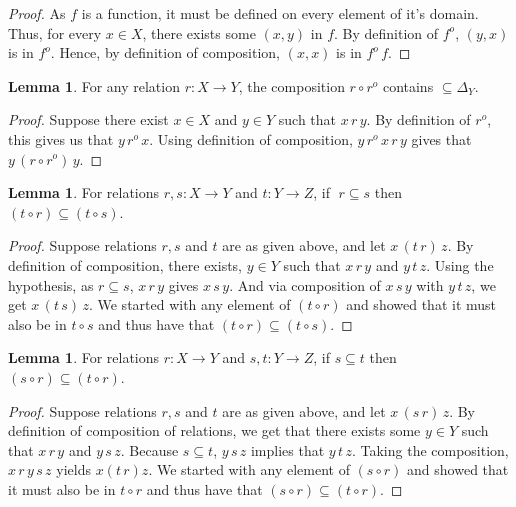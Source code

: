 \documentclass[18pt,a4paper]{article}
\theoremstyle{definition}
\newtheorem{lemma}[theorem]{Lemma}
\begin{document}
\begin{proof}
	As $f$ is a function, it must be defined on every element of it's domain. Thus, for every
	$x \in X$, there exists some $(x,y)$ in $f$. By definition of $f^o$, $(y,x)$ is in $f^o$.
	Hence, by definition of composition, $(x,x)$ is in $f^o \,f$.
\end{proof}
\begin{lemma}
	For any relation $r:X \to Y$, the composition $r\circ r^o$ contains  $\subseteq \Delta_Y$.
\end{lemma}
\begin{proof}
	Suppose there exist $x \in X$ and $y \in Y$ such that
	$x\,r\,y$. By definition of $r^o$, this
	gives us that $y\, r^o \,x$. Using definition of composition,
	$y\, r^o \,x \,r\,y$ gives that	$y\, (r \circ r^o)\, y$.
\end{proof}
\begin{lemma} For relations $r,s:X\to Y$ and $t:Y\to Z$, if $\;r \subseteq s$ then $(t \circ r) \subseteq (t \circ s)$.
\end{lemma}
\begin{proof}
	Suppose relations $r,s$ and $t$ are as given above, and let $x \,(t \, r)\,z$.
	By definition of composition, there
	exists, $y \in Y$ such that $x\,r\,y$ and $y\,t\,z$.
	Using the hypothesis, as $r \subseteq  s $,
	$x\,r\,y$ gives $x\,s\,y$. And via composition of $x\,s\,y$ with $y \, t \, z $, we get
	$x\,(t\,s)\, z$. We started with any element of $(t \circ r)$ and showed that
	it must also be in $t \circ s$ and thus have that $(t \circ r) \subseteq (t \circ s)$.
\end{proof}
\begin{lemma} For relations $r:X\to Y$ and $s,t:Y\to Z$, if $s\subseteq t$ then
	$(s \circ r) \subseteq (t \circ r)$.
\end{lemma}
\begin{proof}
	Suppose relations $r,s$ and $t$ are as given above, and let  $x \,(s \, r)\,z$.
	By definition of composition of relations, we get that there exists
	some $y \in Y$ such that $x\,r\,y$ and $y\,s\,z$. Because $s \subseteq t$, $y\,s\,z$
	implies that $y\,t\,z$. Taking the composition, $x\,r\,y\,s\,z$ yields $x(t\,r)z$.
	We started with any element of $(s \circ r)$ and showed that it must also be in
	$t \circ r$ and thus have that $(s \circ r) \subseteq (t \circ r)$.
\end{proof}
\end{document}
